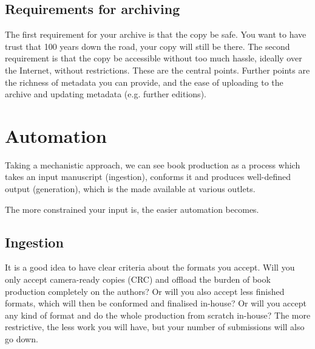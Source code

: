 \documentclass[nonflat,modfonts,output=book] {langsci/langscibook}
\begin{document}
\subsection{Requirements for archiving}
The first requirement for your archive is that the copy be safe. You want to have trust that 100 years down the road, your copy will still be there. The second requirement is that the copy be accessible without too much hassle, ideally over the Internet, without restrictions. These are the central points. Further points are the richness of metadata you can provide, and the ease of uploading to the archive and updating metadata (e.g. further editions).

\section{Automation}\label{sec:automation}
Taking a mechanistic approach, we can see book production as a process which takes an input manuscript (ingestion), conforms it and produces well-defined output (generation), which is the made available at various outlets.
 

The more constrained your input is, the easier automation becomes. 
 
                    
\subsection{Ingestion}
It is a good idea to have clear criteria about the formats you accept. Will you only accept camera-ready copies (CRC) and offload the burden of book production completely on the authors? Or will you also accept less finished formats, which will then be conformed and finalised in-house? Or will you accept any kind of format and do the whole production from scratch in-house? The more restrictive, the less work you will have, but your number of submissions will also go down. 
\end{document}
